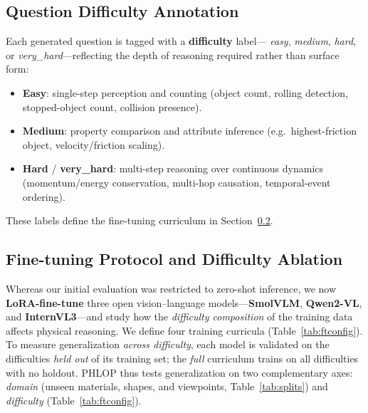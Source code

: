 \subsection{Question Difficulty Annotation}

Each generated question is tagged with a \textbf{difficulty} label---
\textit{easy}, \textit{medium}, \textit{hard}, or \textit{very\_hard}---reflecting
the depth of reasoning required rather than surface form:

\begin{itemize}
  \item \textbf{Easy}: single-step perception and counting (object count, rolling
        detection, stopped-object count, collision presence).
  \item \textbf{Medium}: property comparison and attribute inference
        (e.g.\ highest-friction object, velocity/friction scaling).
  \item \textbf{Hard} / \textbf{very\_hard}: multi-step reasoning over continuous
        dynamics (momentum/energy conservation, multi-hop causation,
        temporal-event ordering).
\end{itemize}

These labels define the fine-tuning curriculum in Section~\ref{sec:finetune}.


\subsection{Fine-tuning Protocol and Difficulty Ablation}
\label{sec:finetune}

Whereas our initial evaluation was restricted to zero-shot inference, we now
\textbf{LoRA-fine-tune} three open vision--language models---\textbf{SmolVLM},
\textbf{Qwen2-VL}, and \textbf{InternVL3}---and study how the \emph{difficulty
composition} of the training data affects physical reasoning. We define four
training curricula (Table~\ref{tab:ftconfig}). To measure generalization
\emph{across difficulty}, each model is validated on the difficulties
\emph{held out} of its training set; the \textit{full} curriculum trains on all
difficulties with no holdout. PHLOP thus tests generalization on two
complementary axes: \emph{domain} (unseen materials, shapes, and viewpoints,
Table~\ref{tab:splits}) and \emph{difficulty} (Table~\ref{tab:ftconfig}).


